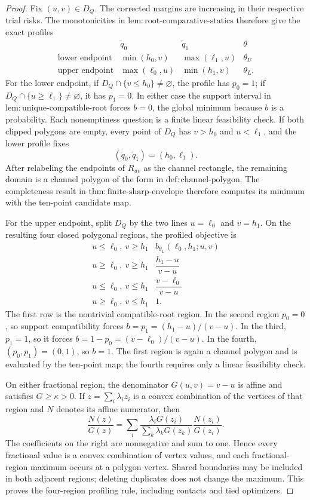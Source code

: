 \documentclass{article}
\begin{document}
\begin{proof}
Fix \((u,v)\in D_Q\). The corrected margins are increasing in their respective trial risks. The monotonicities in \(\mathrm{lem:root\text{-}comparative\text{-}statics}\) therefore give the exact profiles
\[
\begin{array}{c|ccc}
&\widetilde q_0&\widetilde q_1&\theta\\ \hline
\text{lower endpoint}&\min(h_0,v)&\max(\ell_1,u)&\theta_U\\
\text{upper endpoint}&\max(\ell_0,u)&\min(h_1,v)&\theta_L.
\end{array}
\]
For the lower endpoint, if \(D_Q\cap\{v\leq h_0\}\neq\varnothing\), the profile has \(p_0=1\); if \(D_Q\cap\{u\geq\ell_1\}\neq\varnothing\), it has \(p_1=0\). In either case the support interval in \(\mathrm{lem:unique\text{-}compatible\text{-}root}\) forces \(b=0\), the global minimum because \(b\) is a probability. Each nonemptiness question is a finite linear feasibility check. If both clipped polygons are empty, every point of \(D_Q\) has \(v>h_0\) and \(u<\ell_1\), and the lower profile fixes
\[
(\widetilde q_0,\widetilde q_1)=(h_0,\ell_1).
\]
After relabeling the endpoints of \(R_{uv}\) as the channel rectangle, the remaining domain is a channel polygon of the form in \(\mathrm{def:channel\text{-}polygon}\). The completeness result in \(\mathrm{thm:finite\text{-}sharp\text{-}envelope}\) therefore computes its minimum with the ten-point candidate map.

For the upper endpoint, split \(D_Q\) by the two lines \(u=\ell_0\) and \(v=h_1\). On the resulting four closed polygonal regions, the profiled objective is
\[
\begin{array}{c|c}
u\leq\ell_0,\ v\geq h_1
&b_{\theta_L}(\ell_0,h_1;u,v)\\
u\geq\ell_0,\ v\geq h_1
&\dfrac{h_1-u}{v-u}\\
u\leq\ell_0,\ v\leq h_1
&\dfrac{v-\ell_0}{v-u}\\
u\geq\ell_0,\ v\leq h_1
&1.
\end{array}
\]
The first row is the nontrivial compatible-root region. In the second region \(p_0=0\), so support compatibility forces \(b=p_1=(h_1-u)/(v-u)\). In the third, \(p_1=1\), so it forces \(b=1-p_0=(v-\ell_0)/(v-u)\). In the fourth, \((p_0,p_1)=(0,1)\), so \(b=1\). The first region is again a channel polygon and is evaluated by the ten-point map; the fourth requires only a linear feasibility check.

On either fractional region, the denominator \(G(u,v)=v-u\) is affine and satisfies \(G\geq\kappa>0\). If \(z=\sum_i\lambda_i z_i\) is a convex combination of the vertices of that region and \(N\) denotes its affine numerator, then
\[
\frac{N(z)}{G(z)}
=\sum_i
\frac{\lambda_iG(z_i)}{\sum_k\lambda_kG(z_k)}
\frac{N(z_i)}{G(z_i)}.
\]
The coefficients on the right are nonnegative and sum to one. Hence every fractional value is a convex combination of vertex values, and each fractional-region maximum occurs at a polygon vertex. Shared boundaries may be included in both adjacent regions; deleting duplicates does not change the maximum. This proves the four-region profiling rule, including contacts and tied optimizers.


\end{proof}
\end{document}
